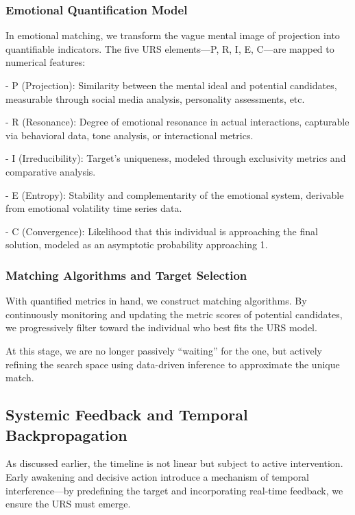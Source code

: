 \documentclass{article}
\begin{document}
\subsubsection{Emotional Quantification Model}

In emotional matching, we transform the vague mental image of projection into quantifiable indicators. The five URS elements—P, R, I, E, C—are mapped to numerical features:

- P (Projection): Similarity between the mental ideal and potential candidates, measurable through social media analysis, personality assessments, etc.

- R (Resonance): Degree of emotional resonance in actual interactions, capturable via behavioral data, tone analysis, or interactional metrics.

- I (Irreducibility): Target’s uniqueness, modeled through exclusivity metrics and comparative analysis.

- E (Entropy): Stability and complementarity of the emotional system, derivable from emotional volatility time series data.

- C (Convergence): Likelihood that this individual is approaching the final solution, modeled as an asymptotic probability approaching 1.

\subsubsection{Matching Algorithms and Target Selection}

With quantified metrics in hand, we construct matching algorithms. By continuously monitoring and updating the metric scores of potential candidates, we progressively filter toward the individual who best fits the URS model.

At this stage, we are no longer passively “waiting” for the one, but actively refining the search space using data-driven inference to approximate the unique match.

\subsection{Systemic Feedback and Temporal Backpropagation}

As discussed earlier, the timeline is not linear but subject to active intervention. Early awakening and decisive action introduce a mechanism of temporal interference—by predefining the target and incorporating real-time feedback, we ensure the URS must emerge.
\end{document}
